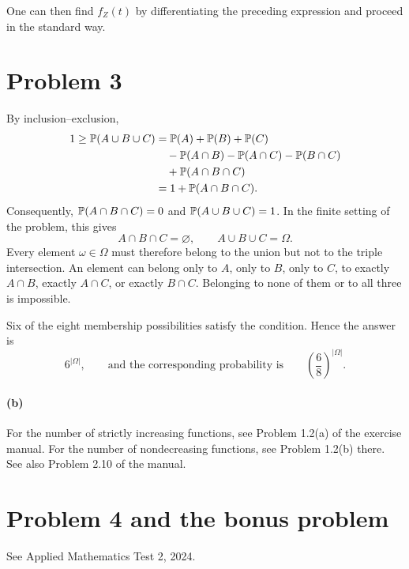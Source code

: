 \documentclass[11pt,a4paper]{article}
\begin{document}
One can then find $f_Z(t)$ by differentiating the preceding expression and proceed in the standard way.

\section*{Problem 3}
By inclusion--exclusion,
\begin{align*}
1\ge\P(A\cup B\cup C)
&=\P(A)+\P(B)+\P(C)\\
&\quad-\P(A\cap B)-\P(A\cap C)-\P(B\cap C)\\
&\quad+\P(A\cap B\cap C)\\
&=1+\P(A\cap B\cap C).
\end{align*}
Consequently, $\P(A\cap B\cap C)=0$ and $\P(A\cup B\cup C)=1$.
In the finite setting of the problem, this gives
\[
A\cap B\cap C=\varnothing,\qquad A\cup B\cup C=\Omega.
\]
Every element $\omega\in\Omega$ must therefore belong to the union but not to the triple intersection. An element can belong only to $A$, only to $B$, only to $C$, to exactly $A\cap B$, exactly $A\cap C$, or exactly $B\cap C$. Belonging to none of them or to all three is impossible.

Six of the eight membership possibilities satisfy the condition. Hence the answer is
\[
6^{|\Omega|},\qquad\text{and the corresponding probability is}\qquad
\left(\frac68\right)^{|\Omega|}.
\]
\paragraph{(b)} For the number of strictly increasing functions, see Problem 1.2(a) of the exercise manual. For the number of nondecreasing functions, see Problem 1.2(b) there. See also Problem 2.10 of the manual.

\section*{Problem 4 and the bonus problem}
See Applied Mathematics Test 2, 2024.
\end{document}
